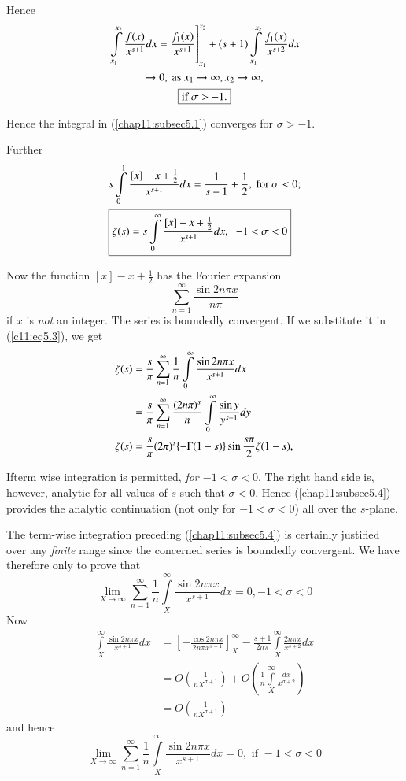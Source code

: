 Hence\pageoriginale
\begin{gather*}
\left. \int\limits^{x_2}_{x_1} \frac{f(x)}{x^{s+1}}
dx = \frac{f_1(x)}{x^{s+1}}\right]^{x_2}_{x_1} + (s+1) \int\limits^{x_2}_{x_1}
  \frac{f_1(x)}{x^{s+2}} dx\\
\to 0, \text{ as } x_1 \to \infty , x_2 \to \infty, \\
\text{\fbox{if $\sigma > -1$.}}
\end{gather*}

Hence the integral in (\ref{chap11:subsec5.1}) converges for $\sigma > - 1$. 

Further
\begin{align}
&s \int\limits^1_0 \frac{[x] -x + \frac{1}{2}}{x^{s+1}} dx =
\frac{1}{s-1} + \frac{1}{2}, \text{ for } \sigma < 0;\notag\\
&\text{\fbox{$\zeta(s) = s \int\limits^\infty_0 \frac{[x] - x +
      \frac{1}{2}}{x^{s +1}} dx, \;\; -1 < \sigma < 0$}}
\label{c11:eq5.3}
\end{align}

Now the function $[x] - x + \frac{1}{2}$ has the Fourier expansion
$$
\sum\limits^\infty_{n=1} \frac{\sin 2n \pi x}{n \pi}
$$
if $x$ is \textit{not} an integer. The series is boundedly
convergent. If we substitute it in (\ref{c11:eq5.3}), we get
\begin{align}
\zeta(s) & = \frac{s}{\pi} \sum\limits^\infty_{n=1} \frac{1}{n}
\int\limits^\infty_0 \frac{\sin 2n \pi  x}{x^{s+1}} dx\notag\\
& = \frac{s}{\pi} \sum\limits^\infty_{n=1} \frac{(2n\pi)^s}{n}
\int\limits^\infty_0 \frac{\sin y}{y^{s+1}} dy\notag\\
\zeta(s) & = \frac{s}{\pi} (2\pi)^s \{-\Gamma (1-s)\} \sin
\frac{s\pi}{2} \zeta(1-s),\label{chap11:subsec5.4}
\end{align}

If\pageoriginale term wise integration is permitted, \textit{for
  $-1<\sigma   <0$}. The right hand side is, however, analytic for all
values of $s$ such that $\sigma < 0$. Hence (\ref{chap11:subsec5.4}) provides the analytic
continuation (not only for $-1< \sigma <0$) all over the $s$-plane. 

The term-wise integration preceding (\ref{chap11:subsec5.4}) is certainly justified over
any \textit{finite} range since the concerned series is boundedly
convergent. We have therefore only to prove that
$$
\lim\limits_{X \to \infty} \sum\limits^\infty_{n=1} \frac{1}{n}
\int\limits^\infty_X \frac{\sin 2n \pi x}{x^{s+1}} dx = 0, -1 < \sigma <0
$$
Now
\begin{align*}
\int\limits^\infty_X \frac{\sin 2 n \pi x}{x^{s+1}} dx & =
\left[-\frac{\cos 2n \pi x}{2n \pi x^{s+1}} \right]^\infty_X -
\frac{s+1}{2n \pi} \int\limits^\infty_X \frac{2n \pi x}{x^{s+2}} dx \\
& = O \left(\frac{1}{nX^{\sigma+1}} \right) + O \left(\frac{1}{n}
\int\limits^\infty_X \frac{dx}{x^{\sigma+2}} \right) \\
& = O \left(\frac{1}{nX^{\sigma+1}} \right)
\end{align*}
and hence
$$
\lim\limits_{X \to \infty} \sum\limits^\infty_{n=1} \frac{1}{n}
\int\limits^\infty_X \frac{\sin 2n \pi x}{x^{s+1}} dx = 0,\text{ if }
-1 < \sigma < 0
$$

